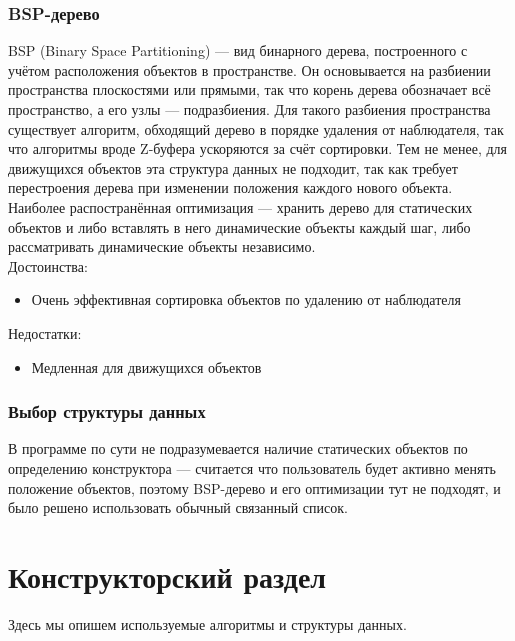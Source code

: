 \documentclass[a4paper,12pt]{report}
\numberwithin{equation}{section}
\begin{document}
\subsubsection*{BSP-дерево}
BSP (Binary Space Partitioning) --- вид бинарного дерева, построенного с учётом расположения объектов в пространстве. Он основывается на разбиении пространства плоскостями или прямыми, так что корень дерева обозначает всё пространство, а его узлы --- подразбиения. Для такого разбиения пространства существует алгоритм, обходящий дерево в порядке удаления от наблюдателя, так что алгоритмы вроде Z-буфера ускоряются за счёт сортировки. Тем не менее, для движущихся объектов эта структура данных не подходит, так как требует перестроения дерева при изменении положения каждого нового объекта. Наиболее распостранённая оптимизация --- хранить дерево для статических объектов и либо вставлять в него динамические объекты каждый шаг, либо рассматривать динамические объекты независимо. \\
Достоинства:
\begin{itemize}
\item Очень эффективная сортировка объектов по удалению от наблюдателя
\end{itemize}
Недостатки:
\begin{itemize}
\item Медленная для движущихся объектов
\end{itemize}

\subsubsection*{Выбор структуры данных}
В программе по сути не подразумевается наличие статических объектов по определению конструктора --- считается что пользователь будет активно менять положение объектов, поэтому BSP-дерево и его оптимизации тут не подходят, и было решено использовать обычный связанный список.

\section{Конструкторский раздел}
Здесь мы опишем используемые алгоритмы и структуры данных.
\end{document}
